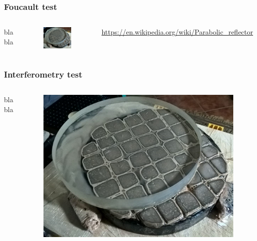 \documentclass{beamer}
\begin{document}
\begin{frame}
\frametitle{Foucault test}
\begin{columns}
bla bla
\begin{figure}
\includegraphics[scale=0.2]{assets/polishing.jpg}
\end{figure}
{\url{https://en.wikipedia.org/wiki/Parabolic_reflector}}

\end{columns}
\end{frame}

\begin{frame}
\frametitle{Interferometry test}
\begin{columns}
bla bla
\begin{figure}
\includegraphics[scale=0.2]{assets/polishing.jpg}
\end{figure}
\end{columns}
\end{frame}
\end{document}
